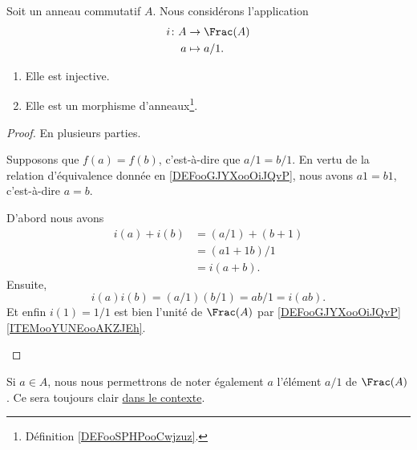 \begin{proposition}     \label{PROPooUULNooKbwuEw}
	Soit un anneau commutatif \( A\). Nous considérons l'application
	\begin{equation}
		\begin{aligned}
			i\colon A & \to \Frac(A) \\
			a         & \mapsto a/1.
		\end{aligned}
	\end{equation}
	\begin{enumerate}
		\item
		      Elle est injective.
		\item
		      Elle est un morphisme d'anneaux\footnote{Définition \ref{DEFooSPHPooCwjzuz}.}.
	\end{enumerate}
\end{proposition}

\begin{proof}
	En plusieurs parties.
	\begin{subproof}
		\spitem[Injective]
		Supposons que \( f(a)=f(b)\), c'est-à-dire que \( a/1=b/1\). En vertu de la relation d'équivalence donnée en \ref{DEFooGJYXooOiJQvP}, nous avons \( a1=b1\), c'est-à-dire \( a=b\).

		D'abord nous avons
		\begin{subequations}
			\begin{align}
				i(a)+i(b) & =(a/1)+(b+1) \\
				          & =(a1+1b)/1   \\
				          & =i(a+b).
			\end{align}
		\end{subequations}
		Ensuite,
		\begin{equation}
			i(a)i(b)=(a/1)(b/1)=ab/1=i(ab).
		\end{equation}
		Et enfin \( i(1)=1/1\) est bien l'unité de \( \Frac(A)\) par \ref{DEFooGJYXooOiJQvP}\ref{ITEMooYUNEooAKZJEh}.
	\end{subproof}
\end{proof}

\begin{normaltext}		\label{NORMooFBKEooBQuATg}
	Si \( a\in A\), nous nous permettrons de noter également \( a\) l'élément \( a/1\) de \( \Frac(A)\). Ce sera toujours clair \href{http://www.madore.org/~david/weblog/d.2006-09-19.1360.html}{dans le contexte}.
\end{normaltext}

